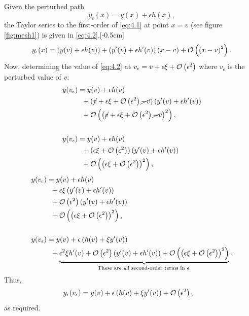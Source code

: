 Given the perturbed path
\begin{equation}
	\label{eq:4.1}
	y_\epsilon(x) = y(x) + \epsilon h(x),
\end{equation}
the Taylor series to the first-order of \eqref{eq:4.1} at point $x=v$ (see figure \ref{fig:mesh1}) is given in \eqref{eq:4.2}.[-0.5cm]
\begin{equation}
\begin{split}
\label{eq:4.2}
y_\epsilon(x)=\left(y(v) + \epsilon h(v)\right) + \left(y^\prime(v) + \epsilon h^\prime(v)\right)(x - v) + \mathcal{O}\left(\left(x -v\right)^2\right).
\end{split}
\end{equation}
Now, determining the value of \eqref{eq:4.2} at $v_\epsilon = v + \epsilon \xi + \mathcal{O}\left(\epsilon^2\right)$ where $v_\epsilon$ is the perturbed value of $v$:
\begin{equation*}
\begin{split}
y(v_\epsilon)&= y(v) + \epsilon h(v)\\ 
&\;\;+ (\cancel{v} + \epsilon \xi + \mathcal{O}\left(\epsilon^2\right)\cancel{-v})\left(y^\prime(v) +\epsilon h^\prime(v)\right)\\ 
&\;\;+ \mathcal{O}\left(\left(\cancel{v} + \epsilon \xi + \mathcal{O}\left(\epsilon^2\right)\cancel{-v}\right)^2\right),\\\\
y(v_\epsilon)&= y(v) + \epsilon h(v)\\
&\;\;+ (\epsilon \xi + \mathcal{O}\left(\epsilon^2\right))\left(y^\prime(v) +\epsilon h^\prime(v)\right)\\
&\;\;+ \mathcal{O}\left(\left(\epsilon \xi + \mathcal{O}\left(\epsilon^2\right)\right)^2\right),
\end{split}
\end{equation*}
\begin{equation*}
\begin{split}
y(v_\epsilon)&= y(v) + \epsilon h(v)\\
&\;\;+ \epsilon\xi\left(y^\prime(v) +\epsilon h^\prime(v)\right)\\
&\;\;+ \mathcal{O}\left(\epsilon^2\right)\left(y^\prime(v) +\epsilon h^\prime(v)\right)\\
&\;\;+ \mathcal{O}\left(\left(\epsilon \xi + \mathcal{O}\left(\epsilon^2\right)\right)^2\right),\\\\
y(v_\epsilon)&=y(v) + \epsilon \left(h(v) + \xi y^\prime(v)\right)\\
&\;\;+ \underbrace{\epsilon^2\xi h^\prime(v)
+ \mathcal{O} \left(\epsilon^2\right)\left(y^\prime(v) +\epsilon h^\prime(v)\right)+ \mathcal{O}\left(\left(\epsilon \xi + \mathcal{O}\left(\epsilon^2\right)\right)^2\right)}_\text{These are all second-order terms in $\epsilon$.}.
\end{split}
\end{equation*}
Thus,
\begin{equation}
\begin{split}
y_\epsilon(v_\epsilon)&=y(v) + \epsilon \left(h(v) + \xi y^\prime(v)\right) + \mathcal{O}\left(\epsilon^2\right),
\end{split}
\end{equation}
as required.

